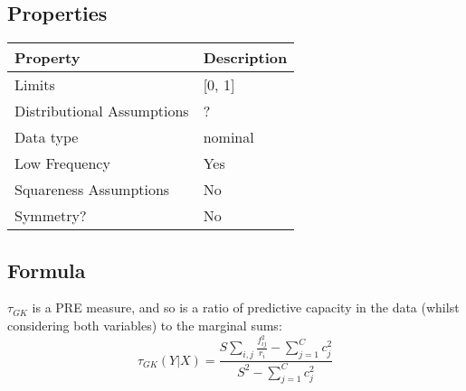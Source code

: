 \documentclass[11pt]{article}
\begin{document}





\subsection{Properties}
\begin{tabular}{| l || l |}
    \hline
    {\bf Property} & {\bf Description} \\
    \hline
    Limits & [0, 1] \\ \hline

    Distributional Assumptions& ? \\ \hline

    Data type & nominal \\ \hline

    Low Frequency & Yes \\ \hline

    Squareness Assumptions & No \\ \hline
    
    Symmetry? & No \\ \hline

\end{tabular}


\subsection{Formula}
$\tau_{GK}$ is a PRE measure, and so is a ratio of predictive capacity in the data (whilst considering both variables) to the marginal sums:
$$
\tau_{GK}(Y|X) = \frac{   S \sum_{i, j}{ \frac{ f_{ij}^2 }{ r_i } } - \sum_{j=1}^{C}{ c_j^2 }    }{   S^2 - \sum_{j=1}^{C}{ c_j^2 }    }
$$
\end{document}
